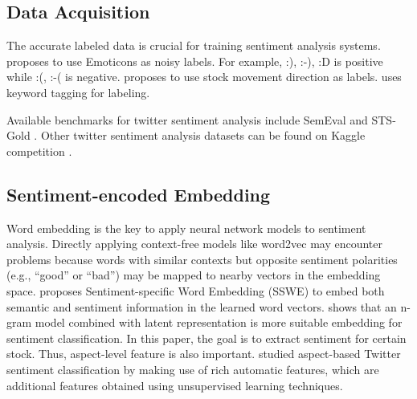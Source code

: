 \documentclass[11pt,a4paper]{article}
\begin{document}
\subsection{Data Acquisition}
The accurate labeled data is crucial for training sentiment analysis systems.  \cite{twitter_classification_distant_super} proposes to use Emoticons as noisy labels. For example, :), :-), :D is positive while :(, :-( is negative. \cite{sentiment_predict_stock_move} proposes to use stock movement direction as labels. \cite{sentiment_airline} uses keyword tagging for labeling.

Available benchmarks for twitter sentiment analysis include SemEval \cite{SemEval_dataset} and STS-Gold \cite{twitter_sentiment_dataset}. Other twitter sentiment analysis datasets can be found on Kaggle competition \cite{kaggle_dataset_1, kaggle_dataset_2}.

\subsection{Sentiment-encoded Embedding}
Word embedding is the key to apply neural network models to sentiment analysis. Directly applying context-free models like word2vec \cite{word2vec} may encounter problems because words with similar contexts but opposite sentiment polarities (e.g., “good” or “bad”) may be mapped to nearby vectors in the embedding space. \cite{sentiment_specific_embedding} proposes Sentiment-specific Word Embedding (SSWE) to embed both semantic and sentiment information in the learned word vectors. \cite{sentiment_n_gram} shows that an n-gram model combined with latent representation is more suitable embedding for sentiment classification. In this paper, the goal is to extract sentiment for certain stock. Thus, aspect-level feature is also important. \cite{aspect_sentiment_embedding} studied aspect-based Twitter sentiment classification by making use of rich automatic features, which are additional features obtained using unsupervised learning techniques.
\end{document}
